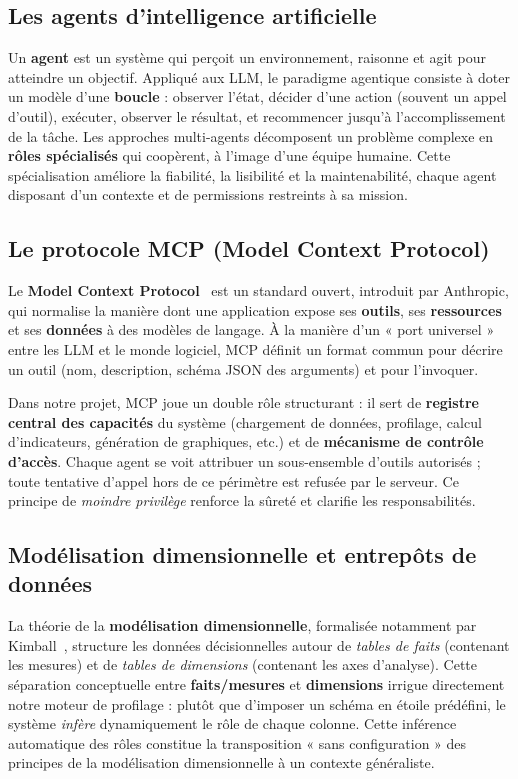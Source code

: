\subsection{Les agents d'intelligence artificielle}
Un \textbf{agent} est un système qui perçoit un environnement, raisonne et
agit pour atteindre un objectif. Appliqué aux LLM, le paradigme agentique
consiste à doter un modèle d'une \textbf{boucle} : observer l'état, décider
d'une action (souvent un appel d'outil), exécuter, observer le résultat, et
recommencer jusqu'à l'accomplissement de la tâche. Les approches multi-agents
décomposent un problème complexe en \textbf{rôles spécialisés} qui coopèrent,
à l'image d'une équipe humaine. Cette spécialisation améliore la fiabilité,
la lisibilité et la maintenabilité, chaque agent disposant d'un contexte et
de permissions restreints à sa mission.

\subsection{Le protocole MCP (Model Context Protocol)}
Le \textbf{Model Context Protocol}~\cite{mcp} est un standard ouvert,
introduit par Anthropic, qui normalise la manière dont une application expose
ses \textbf{outils}, ses \textbf{ressources} et ses \textbf{données} à des
modèles de langage. À la manière d'un « port universel » entre les LLM et le
monde logiciel, MCP définit un format commun pour décrire un outil (nom,
description, schéma JSON des arguments) et pour l'invoquer.

Dans notre projet, MCP joue un double rôle structurant : il sert de
\textbf{registre central des capacités} du système (chargement de données,
profilage, calcul d'indicateurs, génération de graphiques, etc.) et de
\textbf{mécanisme de contrôle d'accès}. Chaque agent se voit attribuer un
sous-ensemble d'outils autorisés ; toute tentative d'appel hors de ce
périmètre est refusée par le serveur. Ce principe de \emph{moindre privilège}
renforce la sûreté et clarifie les responsabilités.

\subsection{Modélisation dimensionnelle et entrepôts de données}
La théorie de la \textbf{modélisation dimensionnelle}, formalisée notamment par
Kimball~\cite{kimball2013}, structure les données décisionnelles autour de
\emph{tables de faits} (contenant les mesures) et de \emph{tables de dimensions}
(contenant les axes d'analyse). Cette séparation conceptuelle entre
\textbf{faits/mesures} et \textbf{dimensions} irrigue directement notre moteur de
profilage : plutôt que d'imposer un schéma en étoile prédéfini, le système
\emph{infère} dynamiquement le rôle de chaque colonne. Cette inférence
automatique des rôles constitue la transposition « sans configuration » des
principes de la modélisation dimensionnelle à un contexte généraliste.

